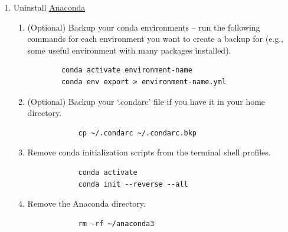 \documentclass{article}
\begin{document}
\begin{enumerate}
    \item Uninstall \href{https://docs.anaconda.com/anaconda/install/uninstall/}{Anaconda}
    \begin{enumerate}
        \item  (Optional) Backup your conda environments -- run the following commands for each environment you want to create a backup for (e.g., some useful environment with many packages installed).
        \begin{verbatim}
        conda activate environment-name
        conda env export > environment-name.yml
        \end{verbatim}

        \item (Optional) Backup your `.condarc' file if you have it in your home directory.
        \begin{verbatim}
            cp ~/.condarc ~/.condarc.bkp
        \end{verbatim}
        \item Remove conda initialization scripts from the terminal shell profiles.

        \begin{verbatim}
            conda activate
            conda init --reverse --all
        \end{verbatim}

        \item Remove the Anaconda directory.
        \begin{verbatim}
            rm -rf ~/anaconda3
        \end{verbatim}


\end{enumerate}
\end{enumerate}
\end{document}
